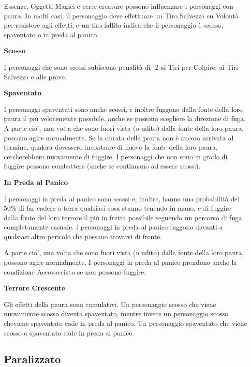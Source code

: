 \documentclass[a4paper,11pt,twoside,openany]{book}
\begin{document}
\label{paura}

Essenze, Oggetti Magici e certe creature possono influenzare i personaggi con paura. In molti casi, il personaggio deve effettuare un Tiro Salvezza su Volontà per resistere agli effetti, e un tiro fallito indica che il personaggio è scosso, spaventato o in preda al panico.

\textbf{Scosso}

I personaggi che sono scossi subiscono penalità di -2 ai Tiri per Colpire, ai Tiri Salvezza e alle prove.

\textbf{Spaventato}

I personaggi spaventati sono anche scossi, e inoltre fuggono dalla fonte della loro paura il più velocemente possibile, anche se possono scegliere la direzione di fuga. A parte cio', una volta che sono fuori vista (o udito) dalla fonte della loro paura, possono agire normalmente. Se la durata della paura non è ancora arrivata al termine, qualora dovessero incontrare di nuovo la fonte della loro paura, cercherebbero nuovamente di fuggire. I personaggi che non sono in grado di fuggire possono combattere (anche se continuano ad essere scossi).

\textbf{In Preda al Panico}

I personaggi in preda al panico sono scossi e, inoltre, hanno una probabilità del 50\% di far cadere a terra qualsiasi cosa stanno tenendo in mano, e di fuggire dalla fonte del loro terrore il più in fretta possibile seguendo un percorso di fuga completamente casuale. I personaggi in preda al panico fuggono davanti a qualsiasi altro pericolo che possano trovarsi di fronte.

A parte cio', una volta che sono fuori vista (o udito) dalla fonte della loro paura, possono agire normalmente. I personaggi in preda al panico prendono anche la condizione Accovacciato se non possono fuggire.

\textbf{Terrore Crescente}

Gli effetti della paura sono cumulativi. Un personaggio scosso che viene nuovamente scosso diventa spaventato, mentre invece un personaggio scosso cheviene spaventato cade in preda al panico. Un personaggio spaventato che viene scosso o spaventato cade in preda al panico.


\subsection{Paralizzato}
\end{document}
